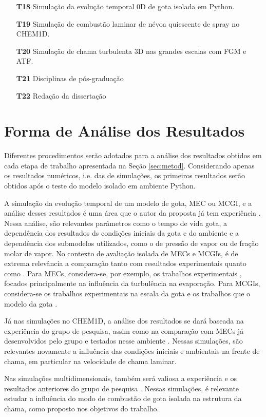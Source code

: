 \begin{itemize}
\item[\textbf{T18}] Simulação da evolução temporal 0D de gota isolada em Python.           %
\item[\textbf{T19}] Simulação de combustão laminar de névoa quiescente de spray no CHEM1D. %
\item[\textbf{T20}] Simulação de chama turbulenta 3D nas grandes escalas com FGM e ATF.    %

\item[\textbf{T21}] Disciplinas de pós-graduação\item[\textbf{T22}] Redação da dissertação\end{itemize}

\section{Forma de Análise dos Resultados} \label{sec:resultados}

Diferentes procedimentos serão adotados para a análise dos resultados obtidos em cada etapa de trabalho apresentada na Seção \ref{sec:metod}.
Considerando apenas os resultados numéricos, i.e. das de simulações, os primeiros resultados serão obtidos após o teste do modelo isolado em ambiente Python. 

A simulação da evolução temporal de um modelo de gota, MEC ou MCGI, e a análise desses resultados é uma área que o autor da proposta já tem experiência \cite{HenningsJ2024MT}. 
Nessa análise, são relevantes parâmetros como o tempo de vida gota, a dependência dos resultados ds condições iniciais da gota e do ambiente e a dependência dos submodelos utilizados, como o de pressão de vapor ou de fração molar de vapor.
No contexto de avaliação isolada de MECs e MCGIs, é de extrema relevância a comparação tanto com resultados experimentais quanto como .
Para MECs, considera-se, por exemplo, os trabalhos experimentais \cite{BiroukM2006,PatelU2019,KayaEyiceD2024,ArabkhalajA2024,MaquaC2008}, focados principalmente na influência da turbulência na evaporação.
Para MCGIs, considera-se os trabalhos experimentais na escala da gota \cite{ChoS1990SCI,CandelS1999,ChenG1996CF,Xu2002,BiroukM2000,CuociA2005,SetyawanH2015} e os trabalhos que  o modelo da gota \cite{Stauch2006,CuociA2005,ChoS1990SCI,KazakovA2003CF,MarcheseA1996CF,WangW2024}.

Já nas simulações no CHEM1D, a análise dos resultados se dará baseada na experiência do grupo de pesquisa, assim como na comparação com MECs já desenvolvidos pelo grupo e testados nesse ambiente \cite{SacomanoF2018CTM,SacomanoF2019IJHMT,SacomanoF2021Fluids,SacomanoF2024CF,SacomanoF2025CF}.
Nessas simulações, são relevantes novamente a influência das condições iniciais e ambientais na frente de chama, em particular na velocidade de chama laminar.

Nas simulações multidimensionais, também será valiosa a experiência e os resultados anteriores do grupo de pesquisa \cite{SacomanoF2017CF,SacomanoF2020CF}.
Nessas simulações, é relevante estudar a influência do modo de combustão de gota isolada na estrutura da chama, como proposto nos objetivos do trabalho.